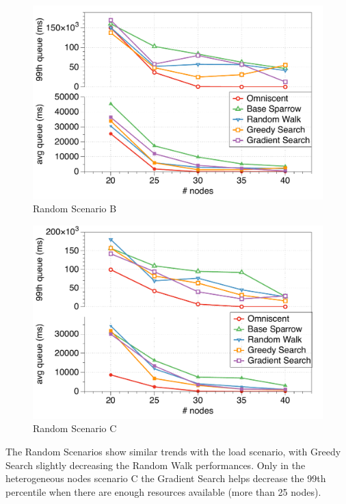 \documentclass[conference]{IEEEtran}
\begin{document}
\begin{figure}
\begin{center}
\includegraphics[scale=0.45]{figures/randomB}
\caption{Random Scenario B}
\label{fig:comparison}
\end{center}
\end{figure}

\begin{figure}
\begin{center}
\includegraphics[scale=0.45]{figures/randomC}
\caption{Random Scenario C}
\label{fig:comparison}
\end{center}
\end{figure}

The Random Scenarios show similar trends with the load scenario, with Greedy Search slightly decreasing the Random Walk performances. 
Only in the heterogeneous nodes scenario C the Gradient Search helps decrease the 99th percentile when there are enough resources available (more than 25 nodes).
\end{document}
